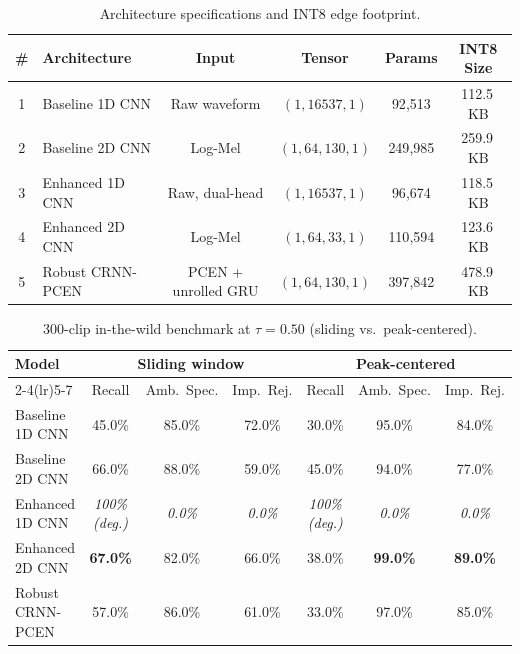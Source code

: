 \documentclass[conference]{IEEEtran}
\begin{document}
\begin{table}[t]
\centering
\caption{Architecture specifications and INT8 edge footprint.}
\label{tab:arch}
\small
\begin{tabular}{clcccc}
\toprule
\textbf{\#} & \textbf{Architecture} & \textbf{Input} & \textbf{Tensor} & \textbf{Params} & \textbf{INT8 Size} \\
\midrule
1 & Baseline 1D CNN & Raw waveform & $(1,16537,1)$ & 92{,}513 & 112.5\,KB \\
2 & Baseline 2D CNN & Log-Mel & $(1,64,130,1)$ & 249{,}985 & 259.9\,KB \\
3 & Enhanced 1D CNN & Raw, dual-head & $(1,16537,1)$ & 96{,}674 & 118.5\,KB \\
4 & Enhanced 2D CNN & Log-Mel & $(1,64,33,1)$ & 110{,}594 & 123.6\,KB \\
5 & Robust CRNN-PCEN & PCEN + unrolled GRU & $(1,64,130,1)$ & 397{,}842 & 478.9\,KB \\
\bottomrule
\end{tabular}
\end{table}

\begin{table}[t]
\centering
\caption{300-clip in-the-wild benchmark at $\tau = 0.50$ (sliding vs.\ peak-centered).}
\label{tab:bench}
\small
\begin{tabular}{lcccccc}
\toprule
\textbf{Model} & \multicolumn{3}{c}{\textbf{Sliding window}} & \multicolumn{3}{c}{\textbf{Peak-centered}} \\
\cmidrule(lr){2-4}\cmidrule(lr){5-7}
 & Recall & Amb.\ Spec. & Imp.\ Rej. & Recall & Amb.\ Spec. & Imp.\ Rej. \\
\midrule
Baseline 1D CNN & 45.0\% & 85.0\% & 72.0\% & 30.0\% & 95.0\% & 84.0\% \\
Baseline 2D CNN & 66.0\% & 88.0\% & 59.0\% & 45.0\% & 94.0\% & 77.0\% \\
Enhanced 1D CNN & \textit{100\% (deg.)} & \textit{0.0\%} & \textit{0.0\%} & \textit{100\% (deg.)} & \textit{0.0\%} & \textit{0.0\%} \\
Enhanced 2D CNN & \textbf{67.0\%} & 82.0\% & 66.0\% & 38.0\% & \textbf{99.0\%} & \textbf{89.0\%} \\
Robust CRNN-PCEN & 57.0\% & 86.0\% & 61.0\% & 33.0\% & 97.0\% & 85.0\% \\
\bottomrule
\end{tabular}
\end{table}
\end{document}
